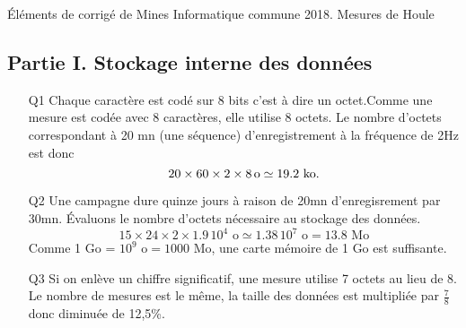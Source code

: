 \'Eléments de corrigé de Mines Informatique commune 2018. Mesures de Houle
\subsection*{Partie I. Stockage interne des données}
\begin{itemize}
 \item[Q1] Chaque caractère est codé sur 8 bits c'est à dire un octet.Comme une mesure est codée avec 8 caractères, elle utilise 8 octets. Le nombre d'octets correspondant à 20 mn (une séquence) d'enregistrement à la fréquence de 2Hz est donc
 \[
  20 \times 60 \times 2 \times 8 \text{\,o} \simeq 19.2 \text{ ko}.
 \]
 \item[Q2] Une campagne dure quinze jours à raison de 20mn d'enregisrement par 30mn. \'Evaluons le nombre d'octets nécessaire au stockage des données.
 \[
  15 \times 24 \times 2 \times 1.9\, 10^{4} \text{ o} \simeq  1.38 \, 10^{7} \text{ o} = 13.8 \text{ Mo}
 \]
Comme 1 Go = $10^{9} \text{ o} = 1000 \text{ Mo}$, une carte mémoire de 1 Go est suffisante.
 \item[Q3] Si on enlève un chiffre significatif, une mesure utilise 7 octets au lieu de 8. Le nombre de mesures est le même, la taille des données est multipliée par $\frac{7}{8}$ donc diminuée de 12,5\%.
\end{itemize}

